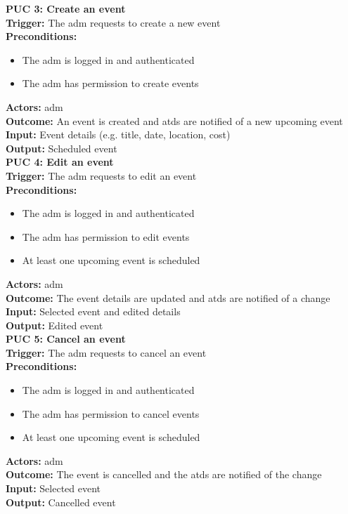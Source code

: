 \documentclass[12pt]{article}
\begin{document}
{\textbf{PUC 3: Create an event} \\
\textbf{Trigger:} The \gls{adm} requests to create a new event \\
\textbf{Preconditions:}
\begin{itemize}
  \item The \gls{adm} is logged in and authenticated
  \item The \gls{adm} has permission to create events
\end{itemize}
\textbf{Actors:} \Gls{adm} \\
\textbf{Outcome:} An event is created and \glspl{atd} are notified of a new upcoming event \\
\textbf{Input:} Event details (e.g. title, date, location, cost) \\
\textbf{Output:} Scheduled event \\[1em]

\textbf{PUC 4: Edit an event} \\
\textbf{Trigger:} The \gls{adm} requests to edit an event \\
\textbf{Preconditions:}
\begin{itemize}
  \item The \gls{adm} is logged in and authenticated
  \item The \gls{adm} has permission to edit events
  \item At least one upcoming event is scheduled
\end{itemize}
\textbf{Actors:} \Gls{adm} \\
\textbf{Outcome:} The event details are updated and \glspl{atd} are notified of a change \\
\textbf{Input:} Selected event and              edited details \\
\textbf{Output:} Edited event \\[1em]

\textbf{PUC 5: Cancel an event} \\
\textbf{Trigger:} The \gls{adm} requests to cancel an event \\
\textbf{Preconditions:}
\begin{itemize}
  \item The \gls{adm} is logged in and authenticated
  \item The \gls{adm} has permission to cancel events
  \item At least one upcoming event is scheduled
\end{itemize}
\textbf{Actors:} \Gls{adm} \\
\textbf{Outcome:} The event is cancelled and the \glspl{atd} are notified of the change \\
\textbf{Input:} Selected event \\
\textbf{Output:} Cancelled event \\[1em]

}
\end{document}
